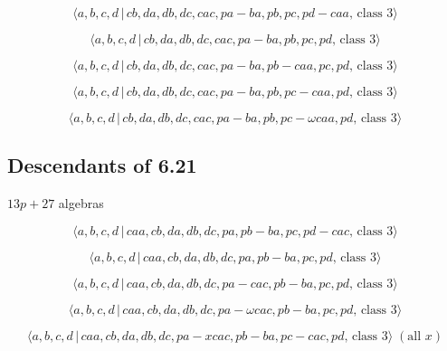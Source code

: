 \documentclass[10pt]{article}
\begin{document}
\begin{equation}
\langle a,b,c,d\,|\,cb,da,db,dc,cac,pa-ba,pb,pc,pd-caa,\,\text{class }%
3\rangle  \tag{7.3869}
\end{equation}

\begin{equation}
\langle a,b,c,d\,|\,cb,da,db,dc,cac,pa-ba,pb,pc,pd,\,\text{class }3\rangle 
\tag{7.3870}
\end{equation}

\begin{equation}
\langle a,b,c,d\,|\,cb,da,db,dc,cac,pa-ba,pb-caa,pc,pd,\,\text{class }%
3\rangle  \tag{7.3871}
\end{equation}

\begin{equation}
\langle a,b,c,d\,|\,cb,da,db,dc,cac,pa-ba,pb,pc-caa,pd,\,\text{class }%
3\rangle  \tag{7.3872}
\end{equation}

\begin{equation}
\langle a,b,c,d\,|\,cb,da,db,dc,cac,pa-ba,pb,pc-\omega caa,pd,\,\text{class }%
3\rangle  \tag{7.3873}
\end{equation}

\subsection{Descendants of 6.21}

$13p+27$ algebras

\begin{equation}
\langle a,b,c,d\,|\,caa,cb,da,db,dc,pa,pb-ba,pc,pd-cac,\,\text{class }%
3\rangle  \tag{7.3874}
\end{equation}

\begin{equation}
\langle a,b,c,d\,|\,caa,cb,da,db,dc,pa,pb-ba,pc,pd,\,\text{class }3\rangle 
\tag{7.3875}
\end{equation}

\begin{equation}
\langle a,b,c,d\,|\,caa,cb,da,db,dc,pa-cac,pb-ba,pc,pd,\,\text{class }%
3\rangle  \tag{7.3876}
\end{equation}

\begin{equation}
\langle a,b,c,d\,|\,caa,cb,da,db,dc,pa-\omega cac,pb-ba,pc,pd,\,\text{class }%
3\rangle  \tag{7.3877}
\end{equation}

\begin{equation}
\langle a,b,c,d\,|\,caa,cb,da,db,dc,pa-xcac,pb-ba,pc-cac,pd,\,\text{class }%
3\rangle \;(\text{all }x)  \tag{7.3878}
\end{equation}
\end{document}
